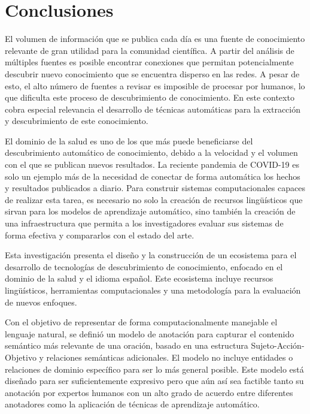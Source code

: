 \chapter{Conclusiones}\label{Chap:Conclusions}

El volumen de información que se publica cada día es una fuente de conocimiento relevante de gran utilidad para la comunidad científica. A partir del análisis de múltiples fuentes es posible encontrar conexiones que permitan potencialmente descubrir nuevo conocimiento que se encuentra disperso en las redes.
A pesar de esto, el alto número de fuentes a revisar es imposible de procesar por humanos, lo que dificulta este proceso de descubrimiento de conocimiento.
En este contexto cobra especial relevancia el desarrollo de técnicas automáticas para la extracción y descubrimiento de este conocimiento.

El dominio de la salud es uno de los que más puede beneficiarse del descubrimiento automático de conocimiento, debido a la velocidad y el volumen con el que se publican nuevos resultados. La reciente pandemia de COVID-19 es solo un ejemplo más de la necesidad de conectar de forma automática los hechos y resultados publicados a diario. Para construir sistemas computacionales capaces de realizar esta tarea, es necesario no solo la creación de recursos lingüísticos que sirvan para los modelos de aprendizaje automático, sino también la creación de una infraestructura que permita a los investigadores evaluar sus sistemas de forma efectiva y compararlos con el estado del arte.

Esta investigación presenta el diseño y la construcción de un ecosistema para el desarrollo de tecnologías de descubrimiento de conocimiento, enfocado en el dominio de la salud y el idioma español.
Este ecosistema incluye recursos lingüísticos, herramientas computacionales y una metodología para la evaluación de nuevos enfoques.

Con el objetivo de representar de forma computacionalmente manejable el lenguaje natural, se definió un modelo de anotación para capturar el contenido semántico más relevante de una oración, basado en una estructura Sujeto-Acción-Objetivo y relaciones semánticas adicionales.
El modelo no incluye entidades o relaciones de dominio específico para ser lo más general posible. Este modelo está diseñado para ser suficientemente expresivo pero que aún así sea factible tanto su anotación por expertos humanos con un alto grado de acuerdo entre diferentes anotadores como la aplicación de técnicas de aprendizaje automático.

